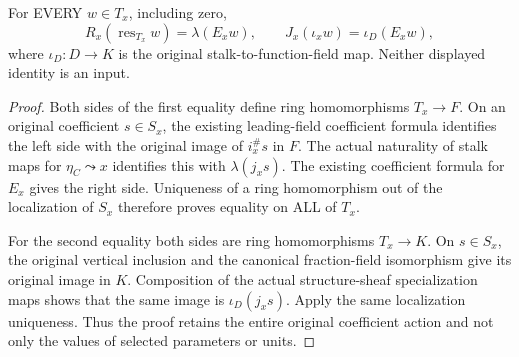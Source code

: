\begin{lemma}
\label{lem:gauss-leading-original-localization-squares}
\leanok
For EVERY $w\in T_x$, including zero,
\[
 R_x(\operatorname{res}_{T_x}w)=\lambda(E_xw),\qquad
 J_x(\iota_xw)=\iota_D(E_xw),
\]
where $\iota_D:D\to K$ is the original stalk-to-function-field map.
Neither displayed identity is an input.
\end{lemma}
\begin{proof}
Both sides of the first equality define ring homomorphisms $T_x\to F$.
On an original coefficient $s\in S_x$, the existing leading-field
coefficient formula identifies the left side with the original image of
$i_x^\#s$ in $F$. The actual naturality of stalk maps for
$\eta_C\leadsto x$ identifies this with $\lambda(j_xs)$. The existing
coefficient formula for $E_x$ gives the right side. Uniqueness of a ring
homomorphism out of the localization of $S_x$ therefore proves equality
on ALL of $T_x$.

For the second equality both sides are ring homomorphisms $T_x\to K$.
On $s\in S_x$, the original vertical inclusion and the canonical
fraction-field isomorphism give its original image in $K$. Composition
of the actual structure-sheaf specialization maps shows that the same
image is $\iota_D(j_xs)$. Apply the same localization uniqueness. Thus
the proof retains the entire original coefficient action and not only
the values of selected parameters or units.
\end{proof}

